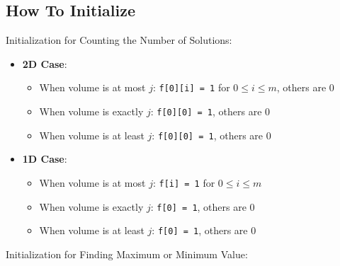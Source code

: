 \subsection{How To Initialize}
Initialization for Counting the Number of Solutions:
\begin{itemize}
    \item \textbf{2D Case}:
    \begin{itemize}
      \item When volume is at most $j$: \texttt{f[0][i] = 1} for $0 \leq i \leq m$, others are 0
      \item When volume is exactly $j$: \texttt{f[0][0] = 1}, others are 0
      \item When volume is at least $j$: \texttt{f[0][0] = 1}, others are 0
    \end{itemize}
    
    \item \textbf{1D Case}:
    \begin{itemize}
      \item When volume is at most $j$: \texttt{f[i] = 1} for $0 \leq i \leq m$
      \item When volume is exactly $j$: \texttt{f[0] = 1}, others are 0
      \item When volume is at least $j$: \texttt{f[0] = 1}, others are 0
    \end{itemize}
\end{itemize}
Initialization for Finding Maximum or Minimum Value:
